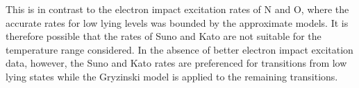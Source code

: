 This is in contrast to the electron impact excitation rates of N and O, where the accurate rates for low lying levels was bounded by the approximate models.
It is therefore possible that the rates of Suno and Kato are not suitable for the temperature range considered.
In the absence of better electron impact excitation data, however, the Suno and Kato rates are preferenced for transitions from low lying states while the Gryzinski model is applied to the remaining transitions.

\begin{figure}[p]
 \centering
  \\

\end{figure}
